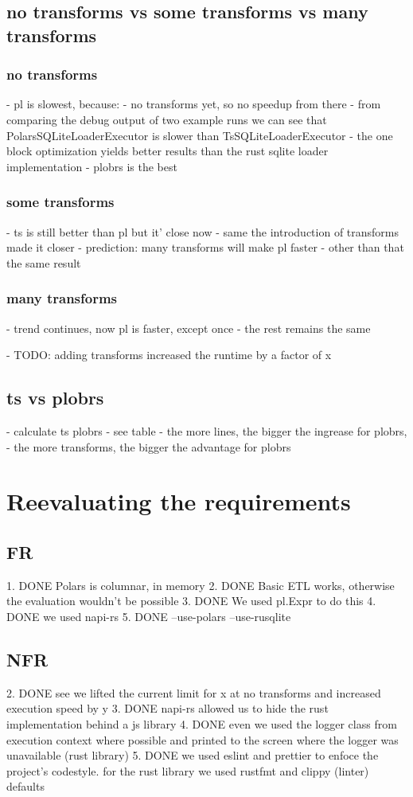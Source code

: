 \subsection{no transforms vs some transforms vs many transforms}
\subsubsection{no transforms}
- pl is slowest, because:
- no transforms yet, so no speedup from there
- from comparing the debug output of two example runs we can see that PolarsSQLiteLoaderExecutor is slower than TsSQLiteLoaderExecutor %
- the one block optimization yields better results than the rust sqlite loader implementation
- plobrs is the best

\subsubsection{some transforms}
- ts is still better than pl but it' close now
- same the introduction of transforms made it closer
- prediction: many transforms will make pl faster
- other than that the same result

\subsubsection{many transforms}
- trend continues, now pl is faster, except once
- the rest remains the same

- TODO: adding transforms increased the runtime by a factor of x

\subsection{ts vs plobrs}
- calculate ts \/ plobrs
- see table
- the more lines, the bigger the ingrease for plobrs,
- the more transforms, the bigger the advantage for plobrs






\section{Reevaluating the requirements}
\subsection{FR}
1. DONE Polars is columnar, in memory
2. DONE Basic ETL works, otherwise the evaluation wouldn't be possible
3. DONE We used pl.Expr to do this
4. DONE we used napi-rs
5. DONE --use-polars --use-rusqlite
\subsection{NFR}
2. DONE see we lifted the current limit for x at no transforms and increased execution speed by y
3. DONE napi-rs allowed us to hide the rust implementation behind a js library
4. DONE even we used the logger class from execution context where possible and printed to the screen where the logger was unavailable (rust library)
5. DONE we used eslint and prettier to enfoce the project's codestyle. for the rust library we used rustfmt and clippy (linter) defaults
